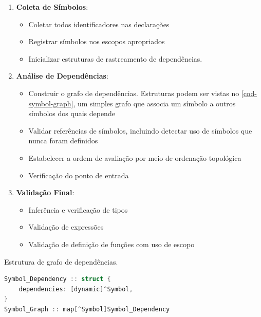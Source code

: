 \begin{enumerate}
    \item \textbf{Coleta de Símbolos}:
    \begin{itemize}
        \item Coletar todos identificadores nas declarações
        \item Registrar símbolos nos escopos apropriados
        \item Inicializar estruturas de rastreamento de dependências.     \end{itemize}

    \item \textbf{Análise de Dependências}:
    \begin{itemize}
        \item Construir o grafo de dependências. Estruturas podem ser vistas no \autoref{cod-symbol-graph}, um simples grafo que associa um símbolo a outros símbolos dos quais depende
        \item Validar referências de símbolos, incluindo detectar uso de símbolos que nunca foram definidos
        \item Estabelecer a ordem de avaliação por meio de ordenação topológica
        \item Verificação do ponto de entrada
    \end{itemize}

    \item \textbf{Validação Final}:
    \begin{itemize}
        \item Inferência e verificação de tipos
        \item Validação de expressões
        \item Validação de definição de funções com uso de escopo
    \end{itemize}
\end{enumerate}

\begin{codigo}[H]
\caption{\small Estrutura de grafo de dependências.}
    \label{cod-symbol-graph}
\begin{lstlisting}[language=C, frame=none, inputencoding=utf8]
Symbol_Dependency :: struct {
    dependencies: [dynamic]^Symbol,
}
Symbol_Graph :: map[^Symbol]Symbol_Dependency
\end{lstlisting}
\end{codigo}


